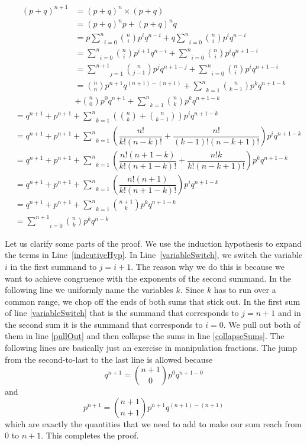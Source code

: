 \begin{align}
(p + q)^{n+1} &= (p + q)^{n} \times (p + q) \\
&= (p+q)^{n}p + (p+q)^{n}q \\
&= p\underset{i=0}{\overset{n}{\sum}} \binom{n}{i} p^{i}q^{n-i} + q\underset{i=0}{\overset{n}{\sum}} \binom{n}{i} p^{i}q^{n-i} \label{indcutiveHyp} \\
&= \underset{i=0}{\overset{n}{\sum}} \binom{n}{i} p^{i+1}q^{n-i} + \underset{i=0}{\overset{n}{\sum}} \binom{n}{i} p^{i}q^{n+1-i} \\
&= \underset{j=1}{\overset{n+1}{\sum}} \binom{n}{j-1} p^{j}q^{n+1-j} + \underset{i=0}{\overset{n}{\sum}} \binom{n}{i} p^{i}q^{n+1-i} \label{variableSwitch} \\
&= \binom{n}{n} p^{n+1}q^{(n+1)-(n+1)} + \underset{k=1}{\overset{n}{\sum}} \binom{n}{k-1} p^{k}q^{n+1-k} \label{pullOut} \\
&+ \binom{n}{0} p^{0}q^{n+1} + \underset{k=1}{\overset{n}{\sum}} \binom{n}{k} p^{k}q^{n+1-k} \nonumber \label{collapseSums}
\end{align}
\begin{align}
&= q^{n+1} + p^{n+1} + \underset{k=1}{\overset{n}{\sum}} \left(\binom{n}{k} + \binom{n}{k-1}\right) p^{i}q^{n+1-k} \\
&= q^{n+1} + p^{n+1} + \underset{k=1}{\overset{n}{\sum}} \left(\dfrac{n!}{k!(n-k)!} + \dfrac{n!}{(k-1)!(n-k+1)!}\right) p^{i}q^{n+1-k} \\
&= q^{n+1} + p^{n+1} + \underset{k=1}{\overset{n}{\sum}} \left(\dfrac{n!(n+1-k)}{k!(n+1-k)!} + \dfrac{n!k}{k!(n-k+1)!}\right) p^{k}q^{n+1-k} \\
&= q^{n+1} + p^{n+1} + \underset{k=1}{\overset{n}{\sum}} \left(\dfrac{n!(n+1)}{k!(n+1-k)!}\right) p^{i}q^{n+1-k} \\
&= q^{n+1} + p^{n+1} + \underset{k=1}{\overset{n}{\sum}} \binom{n+1}{k} p^{k}q^{n+1-k} \\
&= \underset{i=0}{\overset{n+1}{\sum}} \binom{n}{k} p^{k}q^{n-k}
\end{align}

Let us clarify some parts of the proof. We use the induction hypothesis to expand the terms in Line~\ref{indcutiveHyp}. 
In Line~\ref{variableSwitch}, we switch the variable $ i $ in the first summand to $ j = i+1 $. The
reason why we do this is because we want to achieve congruence with the exponents of the second summand. In the following line we 
uniformly name the variables $ k $. Since $ k $ has to run over a common range, we chop off the ends of both sums that stick out. In the first
sum of line \ref{variableSwitch} that is the summand that corresponds to $ j=n+1 $ and in the second sum it is the summand that corresponds
to $ i = 0 $. We pull out both of them in line \ref{pullOut} and then collapse the sums in line \ref{collapseSums}. The following lines 
are basically just an exercise in manipulation fractions. The jump from the second-to-last to the last line is allowed because
$$ q^{n+1} = \binom{n+1}{0}p^{0}q^{n+1-0} $$ and $$ p^{n+1} = \binom{n+1}{n+1}p^{n+1}q^{(n+1)-(n+1)} $$
which are exactly the quantities that we need to add to make our sum reach from $ 0 $ to $ n+1 $. This completes the proof.

